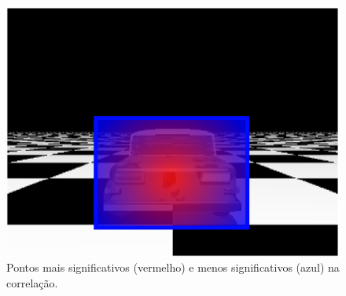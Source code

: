\begin{figure}[H]
\includegraphics[width=\columnwidth]{images/imageErrorcontroled.eps}
\caption{Pontos mais significativos (vermelho) e menos significativos (azul) na correlação.}
\label{fig:errorpondered}
\end{figure}

